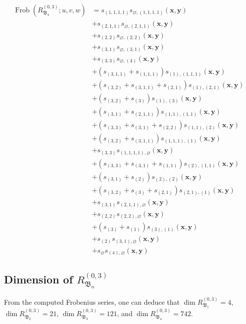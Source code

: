 \documentclass[12pt]{amsart}
\theoremstyle{plain}
\theoremstyle{definition}
\DeclareMathOperator{\Frob}{Frob}
\newcommand{\x}{\mathbf{x}}
\newcommand{\y}{\mathbf{y}}
\begin{document}
\begin{equation}
\begin{aligned}
\Frob(R_{\mathfrak{B}_4}^{(0,3)};u,v,w) &= 
s_{(1,1,1,1)}s_{\varnothing,(1,1,1,1)}(\x,\y)\\ 
&+ s_{(2,1,1)}s_{\varnothing,(2,1,1)}(\x,\y)\\ 
&+ s_{(2,2)}s_{\varnothing,(2,2)}(\x,\y)\\ 
&+ s_{(3,1)}s_{\varnothing,(3,1)}(\x,\y)\\ 
&+ s_{(3,3)}s_{\varnothing,(4)}(\x,\y)\\ 
&+ (s_{(3,1,1)} + s_{(1,1,1)})s_{(1),(1,1,1)}(\x,\y)\\ 
&+ (s_{(3,2)} + s_{(3,1,1)} + s_{(2,1)})s_{(1),(2,1)}(\x,\y)\\ 
&+ (s_{(3,2)} + s_{(3)})s_{(1),(3)}(\x,\y)\\
&+ (s_{(3,1)} + s_{(2,1,1)})s_{(1,1),(1,1)}(\x,\y)\\
&+ (s_{(3,3)} + s_{(3,1)} + s_{(2,2)})s_{(1,1),(2)}(\x,\y)\\
&+ (s_{(3,2)} + s_{(3,1,1)})s_{(1,1,1),(1)}(\x,\y)\\
&+ s_{(3,3)}s_{(1,1,1,1),\varnothing}(\x,\y)\\ 
&+ (s_{(3,3)} + s_{(3,1)} + s_{(1,1)})s_{(2),(1,1)}(\x,\y)\\ 
&+ (s_{(3,1)} + s_{(2)})s_{(2),(2)}(\x,\y)\\ 
&+ (s_{(3,2)} + s_{(3)} + s_{(2,1)})s_{(2,1),(1)}(\x,\y)\\
&+ s_{(3,1)}s_{(2,1,1),\varnothing}(\x,\y)\\
&+ s_{(2,2)}s_{(2,2),\varnothing}(\x,\y)\\ 
&+ (s_{(3)} + s_{(1)})s_{(3),(1)}(\x,\y)\\ 
&+ s_{(2)}s_{(3,1),\varnothing}(\x,\y)\\ 
&+ s_{\varnothing}s_{(4),\varnothing}(\x,\y)
\end{aligned}
\end{equation}

\subsection{Dimension of \texorpdfstring{$R_{\mathfrak{B}_n}^{(0,3)}$}{RBn(0,3)}}
From the computed Frobenius series, one can deduce that $\dim R_{\mathfrak{B}_1}^{(0,3)} = 4$, $\dim R_{\mathfrak{B}_2}^{(0,3)} = 21$, $\dim R_{\mathfrak{B}_3}^{(0,3)} = 121$, and $\dim R_{\mathfrak{B}_4}^{(0,3)} = 742$.



\end{document}
